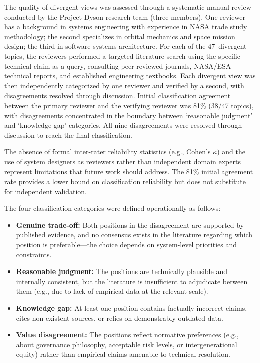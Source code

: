 \documentclass[11pt,a4paper]{article}
\begin{document}
The quality of divergent views was assessed through a systematic manual review conducted by the Project Dyson research team (three members). One reviewer has a background in systems engineering with experience in NASA trade study methodology; the second specializes in orbital mechanics and space mission design; the third in software systems architecture. For each of the 47~divergent topics, the reviewers performed a targeted literature search using the specific technical claim as a query, consulting peer-reviewed journals, NASA/ESA technical reports, and established engineering textbooks. Each divergent view was then independently categorized by one reviewer and verified by a second, with disagreements resolved through discussion. Initial classification agreement between the primary reviewer and the verifying reviewer was 81\% (38/47 topics), with disagreements concentrated in the boundary between `reasonable judgment' and `knowledge gap' categories. All nine disagreements were resolved through discussion to reach the final classification.

The absence of formal inter-rater reliability statistics (e.g., Cohen's $\kappa$) and the use of system designers as reviewers rather than independent domain experts represent limitations that future work should address. The 81\% initial agreement rate provides a lower bound on classification reliability but does not substitute for independent validation.

The four classification categories were defined operationally as follows:

\begin{itemize}[nosep]
    \item \textbf{Genuine trade-off:} Both positions in the disagreement are supported by published evidence, and no consensus exists in the literature regarding which position is preferable---the choice depends on system-level priorities and constraints.
    \item \textbf{Reasonable judgment:} The positions are technically plausible and internally consistent, but the literature is insufficient to adjudicate between them (e.g., due to lack of empirical data at the relevant scale).
    \item \textbf{Knowledge gap:} At least one position contains factually incorrect claims, cites non-existent sources, or relies on demonstrably outdated data.
    \item \textbf{Value disagreement:} The positions reflect normative preferences (e.g., about governance philosophy, acceptable risk levels, or intergenerational equity) rather than empirical claims amenable to technical resolution.
\end{itemize}
\end{document}
